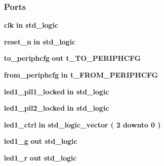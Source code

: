 \subsubsection*{Ports}
 \begin{DoxyCompactItemize}
\item 
{\bf clk}  {\bfseries {\bfseries \textcolor{keywordflow}{in}\textcolor{vhdlchar}{ }}} {\bfseries \textcolor{comment}{std\+\_\+logic}\textcolor{vhdlchar}{ }} 
\item 
{\bf reset\+\_\+n}  {\bfseries {\bfseries \textcolor{keywordflow}{in}\textcolor{vhdlchar}{ }}} {\bfseries \textcolor{comment}{std\+\_\+logic}\textcolor{vhdlchar}{ }} 
\item 
{\bf to\+\_\+periphcfg}  {\bfseries {\bfseries \textcolor{keywordflow}{out}\textcolor{vhdlchar}{ }}} {\bfseries {\bfseries {\bf t\+\_\+\+T\+O\+\_\+\+P\+E\+R\+I\+P\+H\+C\+FG}} \textcolor{vhdlchar}{ }} 
\item 
{\bf from\+\_\+periphcfg}  {\bfseries {\bfseries \textcolor{keywordflow}{in}\textcolor{vhdlchar}{ }}} {\bfseries {\bfseries {\bf t\+\_\+\+F\+R\+O\+M\+\_\+\+P\+E\+R\+I\+P\+H\+C\+FG}} \textcolor{vhdlchar}{ }} 
\item 
{\bf led1\+\_\+pll1\+\_\+locked}  {\bfseries {\bfseries \textcolor{keywordflow}{in}\textcolor{vhdlchar}{ }}} {\bfseries \textcolor{comment}{std\+\_\+logic}\textcolor{vhdlchar}{ }} 
\item 
{\bf led1\+\_\+pll2\+\_\+locked}  {\bfseries {\bfseries \textcolor{keywordflow}{in}\textcolor{vhdlchar}{ }}} {\bfseries \textcolor{comment}{std\+\_\+logic}\textcolor{vhdlchar}{ }} 
\item 
{\bf led1\+\_\+ctrl}  {\bfseries {\bfseries \textcolor{keywordflow}{in}\textcolor{vhdlchar}{ }}} {\bfseries \textcolor{comment}{std\+\_\+logic\+\_\+vector}\textcolor{vhdlchar}{ }\textcolor{vhdlchar}{(}\textcolor{vhdlchar}{ }\textcolor{vhdlchar}{ } \textcolor{vhdldigit}{2} \textcolor{vhdlchar}{ }\textcolor{keywordflow}{downto}\textcolor{vhdlchar}{ }\textcolor{vhdlchar}{ } \textcolor{vhdldigit}{0} \textcolor{vhdlchar}{ }\textcolor{vhdlchar}{)}\textcolor{vhdlchar}{ }} 
\item 
{\bf led1\+\_\+g}  {\bfseries {\bfseries \textcolor{keywordflow}{out}\textcolor{vhdlchar}{ }}} {\bfseries \textcolor{comment}{std\+\_\+logic}\textcolor{vhdlchar}{ }} 
\item 
{\bf led1\+\_\+r}  {\bfseries {\bfseries \textcolor{keywordflow}{out}\textcolor{vhdlchar}{ }}} {\bfseries \textcolor{comment}{std\+\_\+logic}\textcolor{vhdlchar}{ }} 
\item 

\end{DoxyCompactItemize}
